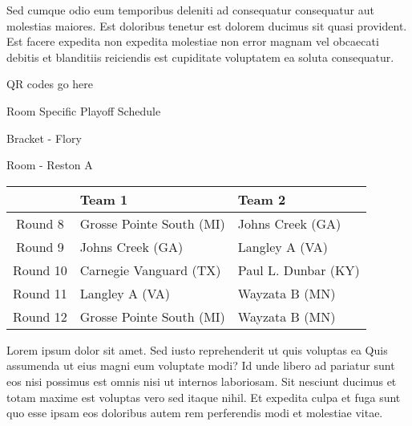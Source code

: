 \documentclass{article}%
\begin{document}
\newline%
Sed cumque odio eum temporibus deleniti ad consequatur consequatur aut molestias maiores. Est doloribus tenetur est dolorem ducimus sit quasi provident. Est facere expedita non expedita molestiae non error magnam vel obcaecati debitis et blanditiis reiciendis est cupiditate voluptatem ea soluta consequatur.%
\vspace*{140pt}%
\begin{center}%
\begin{Huge}%
QR codes go here%
\end{Huge}%
\end{center}%
\newpage%
\begin{center}%
\begin{Huge}%
Room Specific Playoff Schedule%
\end{Huge}%
\vspace*{8pt}%
\linebreak%
\begin{Large}%
Bracket {-} Flory%
\end{Large}%
\vspace*{8pt}%
\linebreak%
\vspace*{8pt}%
\begin{Large}%
Room {-} Reston A%
\end{Large}%
\end{center}%
%
\begin{tabularx}{\textwidth}{|c|Y|Y|}%
\hline%
&Team 1&Team 2\\%
\hline%
Round 8&Grosse Pointe South (MI)&Johns Creek (GA)\\%
Round 9&Johns Creek (GA)&Langley A (VA)\\%
Round 10&Carnegie Vanguard (TX)&Paul L. Dunbar (KY)\\%
Round 11&Langley A (VA)&Wayzata B (MN)\\%
Round 12&Grosse Pointe South (MI)&Wayzata B (MN)\\%
\hline%
\end{tabularx}%
\vspace*{8pt}%
\newline%
Lorem ipsum dolor sit amet. Sed iusto reprehenderit ut quis voluptas ea Quis assumenda ut eius magni eum voluptate modi? Id unde libero ad pariatur sunt eos nisi possimus est omnis nisi ut internos laboriosam. Sit nesciunt ducimus et totam maxime est voluptas vero sed itaque nihil. Et expedita culpa et fuga sunt quo esse ipsam eos doloribus autem rem perferendis modi et molestiae vitae.\newline%
\end{document}
